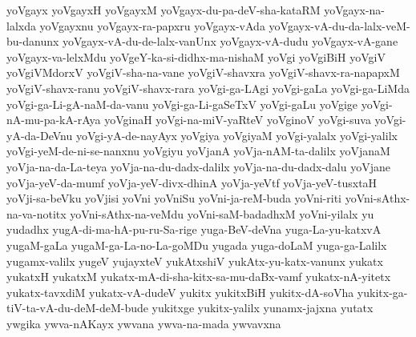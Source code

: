 {yoVgayx
yoVgayxH
yoVgayxM
yoVgayx-du-pa-deV-sha-kataRM
yoVgayx-na-lalxda
yoVgayxnu
yoVgayx-ra-papxru
yoVgayx-vAda
yoVgayx-vA-du-da-lalx-veM-bu-danunx
yoVgayx-vA-du-de-lalx-vanUnx
yoVgayx-vA-dudu
yoVgayx-vA-gane
yoVgayx-va-lelxMdu
yoVgeY-ka-si-didhx-ma-nishaM
yoVgi
yoVgiBiH
yoVgiV
yoVgiVMdorxV
yoVgiV-sha-na-vane
yoVgiV-shavxra
yoVgiV-shavx-ra-napapxM
yoVgiV-shavx-ranu
yoVgiV-shavx-rara
yoVgi-ga-LAgi
yoVgi-gaLa
yoVgi-ga-LiMda
yoVgi-ga-Li-gA-naM-da-vanu
yoVgi-ga-Li-gaSeTxV
yoVgi-gaLu
yoVgige
yoVgi-nA-mu-pa-kA-rAya
yoVginaH
yoVgi-na-miV-yaRteV
yoVginoV
yoVgi-suva
yoVgi-yA-da-DeVnu
yoVgi-yA-de-nayAyx
yoVgiya
yoVgiyaM
yoVgi-yalalx
yoVgi-yalilx
yoVgi-yeM-de-ni-se-nanxnu
yoVgiyu
yoVjanA
yoVja-nAM-ta-dalilx
yoVjanaM
yoVja-na-da-La-teya
yoVja-na-du-dadx-dalilx
yoVja-na-du-dadx-dalu
yoVjane
yoVja-yeV-da-mumf
yoVja-yeV-divx-dhinA
yoVja-yeVtf
yoVja-yeV-tusxtaH
yoVji-sa-beVku
yoVjisi
yoVni
yoVniSu
yoVni-ja-reM-buda
yoVni-riti
yoVni-sAthx-na-va-notitx
yoVni-sAthx-na-veMdu
yoVni-saM-badadhxM
yoVni-yilalx
yu
yudadhx
yugA-di-ma-hA-pu-ru-Sa-rige
yuga-BeV-deVna
yuga-La-yu-katxvA
yugaM-gaLa
yugaM-ga-La-no-La-goMDu
yugada
yuga-doLaM
yuga-ga-Lalilx
yugamx-valilx
yugeV
yujayxteV
yukAtxshiV
yukAtx-yu-katx-vanunx
yukatx
yukatxH
yukatxM
yukatx-mA-di-sha-kitx-sa-mu-daBx-vamf
yukatx-nA-yitetx
yukatx-tavxdiM
yukatx-vA-dudeV
yukitx
yukitxBiH
yukitx-dA-soVha
yukitx-ga-tiV-ta-vA-du-deM-deM-bude
yukitxge
yukitx-yalilx
yunamx-jajxna
yutatx
ywgika
ywva-nAKayx
ywvana
ywva-na-mada
ywvavxna
}
